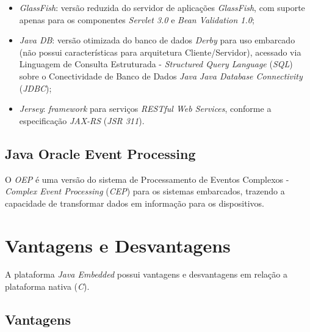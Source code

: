 \begin{itemize}

    \item \textit{GlassFish}: versão reduzida do servidor de aplicações
    \textit{GlassFish}, com suporte apenas para os componentes \textit{Servlet
    3.0} e \textit{Bean Validation 1.0};

    \item \textit{Java DB}: versão otimizada do banco de dados \textit{Derby}
    para uso embarcado (não possui características para arquitetura Cliente/Servidor), acessado via Linguagem de Consulta Estruturada -
    \textit{Structured Query Language} (\textit{SQL}) sobre o Conectividade de
    Banco de Dados \textit{Java} \textit{Java Database Connectivity}
    (\textit{JDBC});

    \item \textit{Jersey}: \textit{framework} para serviços \textit{RESTful Web
    Services}, conforme a especificação \textit{JAX-RS} (\textit{JSR 311}).

\end{itemize}

\subsection{Java Oracle Event Processing}

O \textit{OEP} é uma versão do sistema de
Processamento de Eventos Complexos - \textit{Complex Event Processing}
(\textit{CEP}) para os sistemas embarcados, trazendo a capacidade de
transformar dados em informação para os dispositivos.

\section{Vantagens e Desvantagens}

A plataforma \textit{Java Embedded} possui vantagens e desvantagens em relação
a plataforma nativa (\textit{C}).

\subsection{Vantagens}

